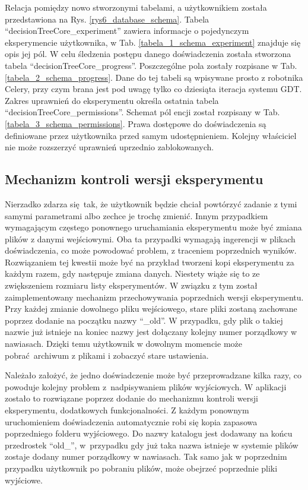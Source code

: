 Relacja pomiędzy nowo stworzonymi tabelami, a użytkownikiem została przedstawiona na Rys. \ref{rys6_database_schema}. Tabela \enquote{decisionTreeCore\_experiment} zawiera informacje o pojedynczym eksperymencie użytkownika, w Tab. \ref{tabela_1_schema_experiment} znajduje się opis jej pól. W celu śledzenia postępu danego doświadczenia została stworzona tabela \enquote{decisionTreeCore\_progress}. Poszczególne pola zostały rozpisane w Tab. \ref{tabela_2_schema_progress}. Dane do tej tabeli są wpisywane prosto z robotnika Celery, przy czym brana jest pod uwagę tylko co dziesiąta iteracja systemu GDT. Zakres uprawnień do eksperymentu określa ostatnia tabela \enquote{decisionTreeCore\_permissions}. Schemat pól encji został rozpisany w Tab. \ref{tabela_3_schema_permissions}. Prawa dostępowe do doświadczenia są definiowane przez użytkownika przed samym udostępnieniem. Kolejny właściciel nie może rozszerzyć uprawnień uprzednio zablokowanych.  





\subsection{Mechanizm kontroli wersji eksperymentu}
Nierzadko zdarza się tak, że użytkownik będzie chciał powtórzyć zadanie z tymi samymi parametrami albo zechce je trochę zmienić. Innym przypadkiem wymagającym częstego ponownego uruchamiania eksperymentu może być zmiana plików z danymi wejściowymi. Oba ta przypadki wymagają ingerencji w plikach doświadczenia, co może powodować problem, z traceniem poprzednich wyników. Rozwiązaniem tej kwestii może być na przykład tworzeni kopi eksperymentu za każdym razem, gdy następuje zmiana danych. Niestety wiąże się to ze zwiększeniem rozmiaru listy eksperymentów. W związku z tym został zaimplementowany mechanizm przechowywania poprzednich wersji eksperymentu. Przy każdej zmianie dowolnego pliku wejściowego, stare pliki zostaną zachowane poprzez dodanie na początku nazwy \enquote{\_old}. W przypadku, gdy plik o takiej nazwie już istnieje na koniec nazwy jest dołączany kolejny numer porządkowy w nawiasach. Dzięki temu użytkownik w dowolnym momencie może pobrać archiwum z plikami i zobaczyć stare ustawienia.

Należało założyć, że jedno doświadczenie może być przeprowadzane kilka razy, co powoduje kolejny problem z~nadpisywaniem plików wyjściowych. W aplikacji zostało to rozwiązane poprzez dodanie do mechanizmu kontroli wersji eksperymentu, dodatkowych funkcjonalności. Z każdym ponownym uruchomieniem doświadczenia automatycznie robi się kopia zapasowa poprzedniego folderu wyjściowego. Do nazwy katalogu jest dodawany na końcu przedrostek \enquote{old\_}, w~przypadku gdy już taka nazwa istnieje w systemie plików zostaje dodany numer porządkowy w nawiasach. Tak samo jak w poprzednim przypadku użytkownik po pobraniu plików, może obejrzeć poprzednie pliki wyjściowe. 

